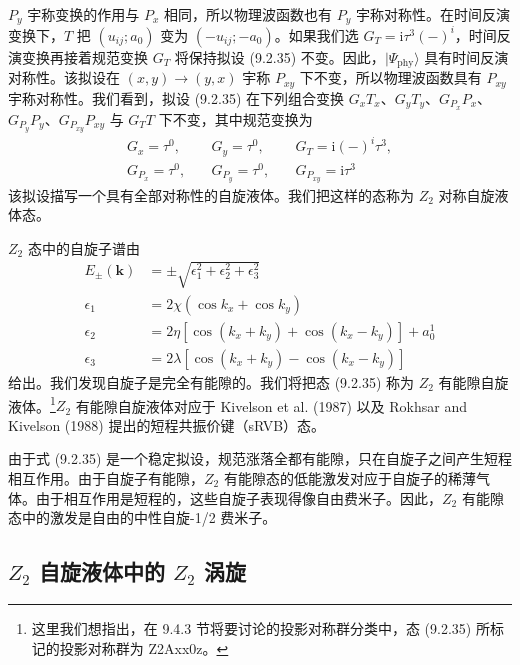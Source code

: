 $P_y$ 宇称变换的作用与 $P_x$ 相同，所以物理波函数也有 $P_y$ 宇称对称性。在时间反演变换下，$T$ 把 $(u_{ij};a_0)$ 变为 $(-u_{ij};-a_0)$。如果我们选 $G_T=\mathrm{i}\tau^{3}(-)^{i}$，时间反演变换再接着规范变换 $G_T$ 将保持拟设 (9.2.35) 不变。因此，$|\Psi_{\mathrm{phy}}\rangle$ 具有时间反演对称性。该拟设在 $(x,y)\to(y,x)$ 宇称 $P_{xy}$ 下不变，所以物理波函数具有 $P_{xy}$ 宇称对称性。我们看到，拟设 (9.2.35) 在下列组合变换 $G_xT_x$、$G_yT_y$、$G_{P_x}P_x$、$G_{P_y}P_y$、$G_{P_{xy}}P_{xy}$ 与 $G_TT$ 下不变，其中规范变换为
\begin{equation*}
\begin{array}{ccc}
G_x=\tau^{0}, & \quad G_y=\tau^{0}, & \quad G_T=\mathrm{i}(-)^{i}\tau^{3},\\
G_{P_x}=\tau^{0}, & \quad G_{P_y}=\tau^{0}, & \quad G_{P_{xy}}=\mathrm{i}\tau^{3}
\end{array}
\tag{9.2.37}
\end{equation*}
该拟设描写一个具有全部对称性的自旋液体。我们把这样的态称为 $Z_2$ 对称自旋液体态。

$Z_2$ 态中的自旋子谱由
\begin{align*}
E_{\pm}(\pmb{k})&=\pm\sqrt{\epsilon_1^{2}+\epsilon_2^{2}+\epsilon_3^{2}}\\
\epsilon_1&=2\chi(\cos k_x+\cos k_y)\\
\epsilon_2&=2\eta[\cos(k_x+k_y)+\cos(k_x-k_y)]+a_0^{1}\\
\epsilon_3&=2\lambda[\cos(k_x+k_y)-\cos(k_x-k_y)]
\end{align*}
给出。我们发现自旋子是完全有能隙的。我们将把态 (9.2.35) 称为 $Z_2$ 有能隙自旋液体。\footnote{这里我们想指出，在 9.4.3 节将要讨论的投影对称群分类中，态 (9.2.35) 所标记的投影对称群为 Z2Axx0z。}$Z_2$ 有能隙自旋液体对应于 Kivelson et al. (1987) 以及 Rokhsar and Kivelson (1988) 提出的短程共振价键（sRVB）态。

由于式 (9.2.35) 是一个稳定拟设，规范涨落全都有能隙，只在自旋子之间产生短程相互作用。由于自旋子有能隙，$Z_2$ 有能隙态的低能激发对应于自旋子的稀薄气体。由于相互作用是短程的，这些自旋子表现得像自由费米子。因此，$Z_2$ 有能隙态中的激发是自由的中性自旋-1/2 费米子。


\subsection{$Z_2$ 自旋液体中的 $Z_2$ 涡旋}

